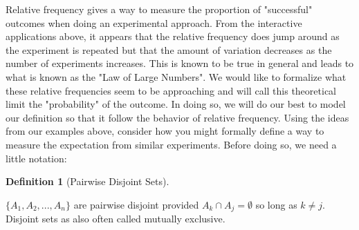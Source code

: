 \documentclass[10pt,]{book}
\theoremstyle{plain}
\theoremstyle{definition}
\newtheorem{definition}[theorem]{Definition}
\theoremstyle{definition}
\theoremstyle{definition}
\numberwithin{equation}{section}
\begin{document}
		Relative frequency gives a way to measure the proportion of "successful" outcomes when doing an experimental approach. From the interactive applications above, it appears that the relative frequency does jump around as the experiment is repeated but that the amount of variation decreases as the number of experiments increases. This is known to be true in general and leads to what is known as the "Law of Large Numbers". We would like to formalize what these relative frequencies seem to be approaching and will call this theoretical limit the "probability" of the outcome. In doing so, we will do our best to model our definition so that it follow the behavior of relative frequency.
Using the ideas from our examples above, consider how you might formally define a way
	to measure the expectation from similar experiments.  Before doing so, we need a little notation:%
\begin{definition}[{Pairwise Disjoint Sets}]\label{definition-20}

	\( \{ A_1, A_2, ... , A_n \}\) are pairwise disjoint provided \(A_k \cap A_j = \emptyset\) so long as \(k \ne j\).
	Disjoint sets as also often called mutually exclusive.
\end{definition}
\par
\end{document}
